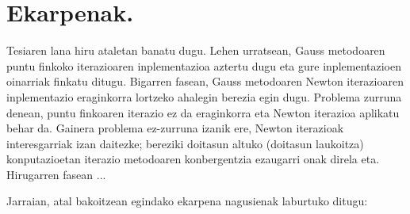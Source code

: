 \section{Ekarpenak.}

Tesiaren lana hiru ataletan banatu dugu. Lehen urratsean, Gauss metodoaren puntu finkoko iterazioaren inplementazioa aztertu dugu eta gure inplementazioen oinarriak finkatu ditugu. Bigarren fasean, Gauss metodoaren Newton iterazioaren inplementazio eraginkorra lortzeko ahalegin berezia egin dugu. Problema zurruna denean, puntu finkoaren iterazio ez da eraginkorra eta Newton iterazioa aplikatu behar da. Gainera problema ez-zurruna izanik ere, Newton iterazioak interesgarriak izan daitezke; bereziki doitasun altuko (doitasun
laukoitza) konputazioetan iterazio metodoaren konbergentzia ezaugarri onak direla eta.  Hirugarren fasean ...

Jarraian, atal bakoitzean egindako ekarpena nagusienak laburtuko ditugu:

